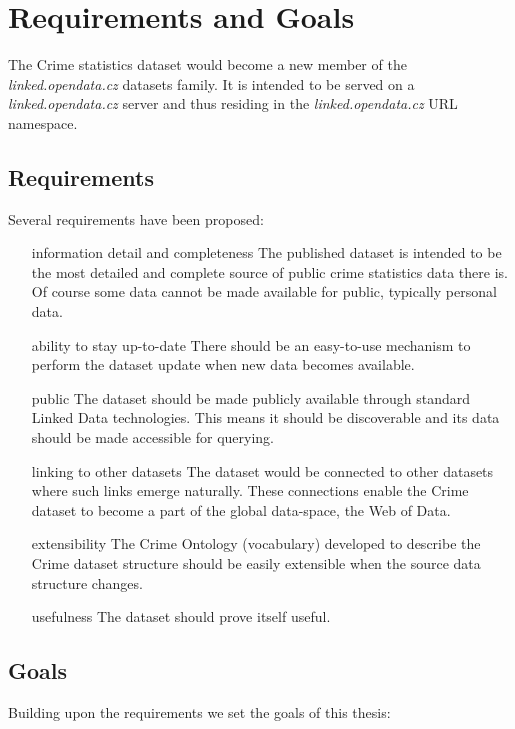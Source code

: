 \chapter{Requirements and Goals}
The Crime statistics dataset would become a new member of the \textit{linked.opendata.cz} datasets family.
It is intended to be served on a \textit{linked.opendata.cz} server and thus residing in the \textit{linked.opendata.cz} URL namespace.

\section{Requirements}
Several requirements have been proposed:\\
\begin{itemize}
	\item[information detail and completeness]
	The published dataset is intended to be the most detailed and complete source of public crime statistics data there is.
	Of course some data cannot be made available for public, typically personal data.
	
	\item[ability to stay up-to-date]
	There should be an easy-to-use mechanism to perform the dataset update when new data becomes available.
	
	\item[public]
	The dataset should be made publicly available through standard Linked Data technologies. This means it should be discoverable and its data should be made accessible for querying.
	
	\item[linking to other datasets]
	The dataset would be connected to other datasets where such links emerge naturally. These connections enable the Crime dataset to become a part of the global data-space, the Web of Data.
	
	\item[extensibility]
	The Crime Ontology (vocabulary) developed to describe the Crime dataset structure should be easily extensible when the source data structure changes.
	
	\item[usefulness]
	The dataset should prove itself useful.
	
\end{itemize}


\section{Goals}
Building upon the requirements we set the goals of this thesis:

